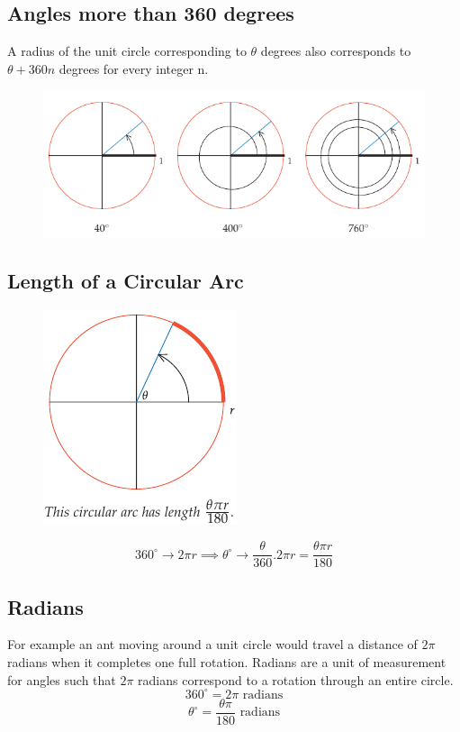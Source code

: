 \subsection{Angles more than 360 degrees}
A radius of the unit circle corresponding to $\theta$ degrees also corresponds to $\theta + 360n$ degrees for every integer n.
\begin{figure}[h]
    \centering
    \includegraphics[scale=0.4]{pics/3.png}
\end{figure}

\subsection{Length of a Circular Arc}
\begin{figure}
    \centering
    \includegraphics[scale=0.5]{pics/5.png}
\end{figure}
\[ 360^{\circ}   \rightarrow  2 \pi r \implies \theta^{\circ}  \rightarrow \frac{\theta}{360}.2\pi r  = \frac{\theta \pi r}{180}\]

\subsection{Radians}
For example an ant moving around a unit circle would travel a distance of $2\pi$ radians when it completes one full rotation.
Radians are a unit of measurement for angles such that $2\pi$ radians correspond to a rotation through an entire circle.
\[ 360^{\circ} = 2 \pi \text{ radians} \]
\[ \theta ^{\circ}  = \frac{\theta \pi}{180} \text{ radians} \]

